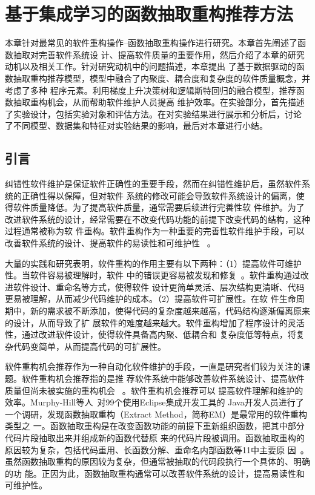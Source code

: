 

\chapter{基于集成学习的函数抽取重构推荐方法} 
本章针对最常见的软件重构操作--函数抽取重构操作进行研究。本章首先阐述了函数抽取对完善软件系统设
计、提高软件质量的重要作用，然后介绍了本章的研究动机以及相关工作。针对研究动机中的问题描述，本章提出
了基于数据驱动的函数抽取重构推荐模型，模型中融合了内聚度、耦合度和复杂度的软件质量概念，并考虑了多种
程序元素。利用梯度上升决策树和逻辑斯特回归的融合模型，推荐函数抽取重构机会，从而帮助软件维护人员提高
维护效率。在实验部分，首先描述了实验设计，包括实验对象和评估方法。在对实验结果进行展示和分析后，讨论
了不同模型、数据集和特征对实验结果的影响，最后对本章进行小结。

\section{引言}
纠错性软件维护是保证软件正确性的重要手段，然而在纠错性维护后，虽然软件系统的正确性得以保障，但对软件
系统的修改可能会导致软件系统设计的偏离，使得软件质量降低。为了提高软件质量，通常需要后续进行完善性软
件维护。为了改进软件系统的设计，经常需要在不改变代码功能的前提下改变代码的结构，这种过程通常被称为软
件重构。软件重构作为一种重要的完善性软件维护手段，可以改善软件系统的设计、提高软件的易读性和可维护性
~\cite{fowler,mens:TSE04}。

大量的实践和研究表明，软件重构的作用主要有以下两种：（1）提高软件可维护性。当软件容易被理解时，软件
中的错误更容易被发现和修复~\cite{martin2009clean}。软件重构通过改进软件设计、重命名等方式，使得软件
设计更简单灵活、层次结构更清晰、代码更易被理解，从而减少代码维护的成本。（2）提高软件可扩展性。在软
件生命周期中，新的需求被不断添加，使得代码的复杂度越来越高，代码结构逐渐偏离原来的设计，从而导致了扩
展软件的难度越来越大。软件重构增加了程序设计的灵活性，通过改进软件设计，使得软件具备高内聚、低耦合和
复杂度低等特点，将复杂代码变简单，从而提高代码的可扩展性。

软件重构机会推荐作为一种自动化软件维护的手段，一直是研究者们较为关注的课题。软件重构机会推荐指的是推
荐软件系统中能够改善软件系统设计、提高软件质量但尚未被实施的重构机会
~\cite{fokaefs:icse11,higo:JSME,Liu:IEEE-TSE:12,Tourwe:CSMR03,Tsantalis:2011}。软件重构机会推荐可以
提高软件理解和维护的效率。Murphy-Hill等人~\cite{Murphy-Hill:ICSE09}对99个使用Eclipse集成开发工具的
Java开发人员进行了一个调研，发现函数抽取重构（Extract Method，简称EM）是最常用的软件重构类型之
一。函数抽取重构是在改变函数功能的前提下重新组织函数，把其中部分代码片段抽取出来并组成新的函数代替原
来的代码片段被调用。函数抽取重构的原因较为复杂，包括代码重用、长函数分解、重命名内部函数等11中主要原
因~\cite{silva2016we}。虽然函数抽取重构的原因较为复杂，但通常被抽取的代码段执行一个具体的、明确的功
能。正因为此，函数抽取重构通常可以改善软件系统的设计，提高易读性和可维护性。

